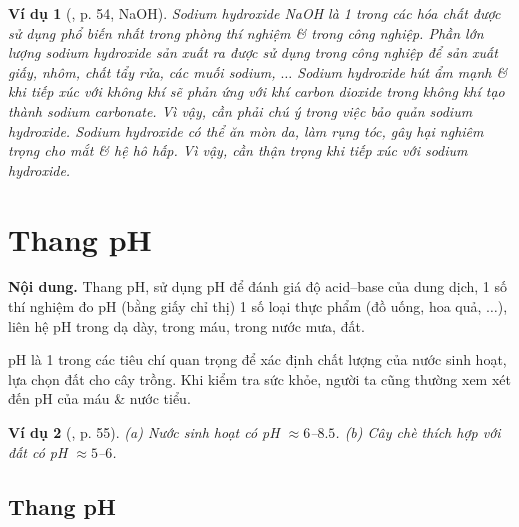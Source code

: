\documentclass{article}
\newtheorem{vidu}{Ví dụ}
\begin{document}
\begin{vidu}[\cite{SGK_KHTN_8_Canh_Dieu}, p. 54, NaOH]
	Sodium hydroxide {\rm NaOH} là 1 trong các hóa chất được sử dụng phổ biến nhất trong phòng thí nghiệm \& trong công nghiệp. Phần lớn lượng sodium hydroxide sản xuất ra được sử dụng trong công nghiệp để sản xuất giấy, nhôm, chất tẩy rửa, các muối sodium, $\ldots$ Sodium hydroxide hút ẩm mạnh \& khi tiếp xúc với không khí sẽ phản ứng với khí carbon dioxide trong không khí tạo thành sodium carbonate. Vì vậy, cần phải chú ý trong việc bảo quản sodium hydroxide. Sodium hydroxide có thể ăn mòn da, làm rụng tóc, gây hại nghiêm trọng cho mắt \& hệ hô hấp. Vì vậy, cần thận trọng khi tiếp xúc với sodium hydroxide.
\end{vidu}
\noindent{}


\section{Thang pH}
\textsf{\textbf{Nội dung.} Thang pH, sử dụng pH để đánh giá độ acid--base của dung dịch, 1 số thí nghiệm đo pH (bằng giấy chỉ thị) 1 số loại thực phẩm (đồ uống, hoa quả, $\ldots$), liên hệ pH trong dạ dày, trong máu, trong nước mưa, đất.}

pH là 1 trong các tiêu chí quan trọng để xác định chất lượng của nước sinh hoạt, lựa chọn đất cho cây trồng. Khi kiểm tra sức khỏe, người ta cũng thường xem xét đến pH của máu \& nước tiểu.

\begin{vidu}[\cite{SGK_KHTN_8_Canh_Dieu}, p. 55]
	(a) Nước sinh hoạt có pH $\approx6$--$8.5$. (b) Cây chè thích hợp với đất có pH $\approx5$--$6$.
\end{vidu}

\subsection{Thang pH}
\end{document}
